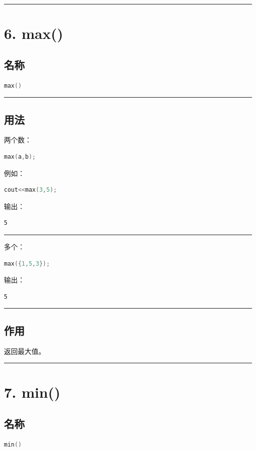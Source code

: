 \documentclass[10pt,twocolumn]{extarticle}
\begin{document}
\noindent\rule{\linewidth}{0.4pt}

\section{6. max()}

\subsection{名称}
\begin{lstlisting}[language=C++]
max()
\end{lstlisting}

\noindent\rule{\linewidth}{0.4pt}

\subsection{用法}
两个数：
\begin{lstlisting}[language=C++]
max(a,b);
\end{lstlisting}
例如：
\begin{lstlisting}[language=C++]
cout<<max(3,5);
\end{lstlisting}
输出：
\begin{lstlisting}
5
\end{lstlisting}

\noindent\rule{\linewidth}{0.4pt}

多个：
\begin{lstlisting}[language=C++]
max({1,5,3});
\end{lstlisting}
输出：
\begin{lstlisting}
5
\end{lstlisting}

\noindent\rule{\linewidth}{0.4pt}

\subsection{作用}
返回最大值。

\noindent\rule{\linewidth}{0.4pt}

\section{7. min()}

\subsection{名称}
\begin{lstlisting}[language=C++]
min()
\end{lstlisting}
\end{document}
